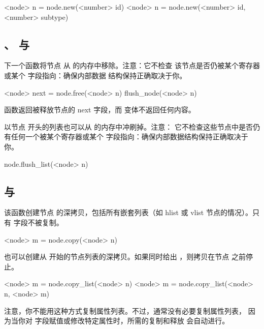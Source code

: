 \begin{typing}
<node> n =
    node.new(<number> id)
<node> n =
    node.new(<number> id, <number> subtype)
\end{typing}

\subsection{、 与 }


下一个函数将节点  从 \TEX 的内存中移除。注意：它不检查
该节点是否仍被某个寄存器或某个  字段指向：确保内部数据
结构保持正确取决于你。

\begin{typing}
<node> next =
    node.free(<node> n)
flush_node(<node> n)
\end{typing}

 函数返回被释放节点的 next 字段，而 
变体不返回任何内容。

以节点  开头的列表也可以从 \TEX 的内存中冲刷掉。注意：
它不检查这些节点中是否仍有任何一个被某个寄存器或某个 
字段指向：确保内部数据结构保持正确取决于你。

\begin{typing}
node.flush_list(<node> n)
\end{typing}

\subsection{ 与 }


该函数创建节点  的深拷贝，包括所有嵌套列表（如 hlist 或
vlist 节点的情况）。只有  字段不被复制。

\begin{typing}
<node> m =
    node.copy(<node> n)
\end{typing}

也可以创建从  开始的节点列表的深拷贝。如果同时给出
，则拷贝在节点  之前停止。

\begin{typing}
<node> m =
    node.copy_list(<node> n)
<node> m =
    node.copy_list(<node> n, <node> m)
\end{typing}

注意，你不能用这种方式复制属性列表。不过，通常没有必要复制属性列表，
因为当你对  字段赋值或修改特定属性时，所需的复制和释放
会自动进行。

